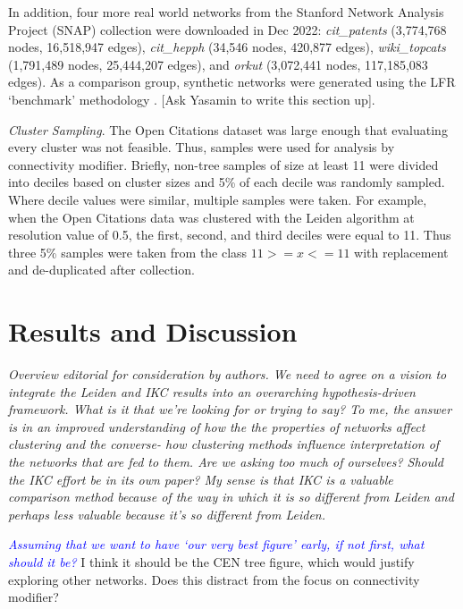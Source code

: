 \documentclass[12pt, oneside]{article}   	%
\begin{document}
In addition, four more real world networks from the Stanford Network Analysis Project (SNAP) collection \citep{leskovec2016snap} were downloaded in Dec 2022: \emph{cit\_patents} (3,774,768 nodes, 16,518,947 edges), \emph{cit\_hepph} (34,546 nodes, 420,877 edges), \emph{wiki\_topcats} (1,791,489 nodes, 25,444,207 edges), and \emph{orkut} (3,072,441 nodes, 117,185,083 edges). As a comparison group, synthetic networks were generated using the LFR `benchmark' methodology \citep{Lancichinetti2008}. [Ask Yasamin to write this section up].

\emph{Cluster Sampling}. The Open Citations dataset was large enough that evaluating every cluster was not feasible. Thus, samples were used for analysis by connectivity modifier. Briefly, non-tree samples of size at least 11 were divided into deciles based on cluster sizes and 5\% of each decile was randomly sampled. Where decile values were similar, multiple samples were taken. For example, when the Open Citations data was clustered with the Leiden algorithm at resolution value of 0.5, the first, second, and third deciles were equal to 11. Thus three 5\% samples were taken from the class $11 >= x <=11$ with replacement and de-duplicated after collection. 

\section{Results and Discussion}

\emph{Overview editorial for consideration by authors. We need to agree on a vision to integrate the Leiden and IKC results into an overarching hypothesis-driven framework. What is it that we're looking for or trying to say? To me, the answer is in an improved understanding of how the the properties of networks affect clustering and the converse- how clustering methods influence interpretation of the networks that are fed to them. Are we asking too much of ourselves? Should the IKC effort be in its own paper? My sense is that IKC is a valuable comparison method because of the way in which it is so different from Leiden and perhaps less valuable because it's so different from Leiden.}

\textcolor{blue}{\emph{Assuming that we want to have `our very best figure' early, if not first, what should it be?}} I think it should be the CEN tree figure, which would justify exploring other networks.  Does this distract from the focus on connectivity modifier?
\end{document}
